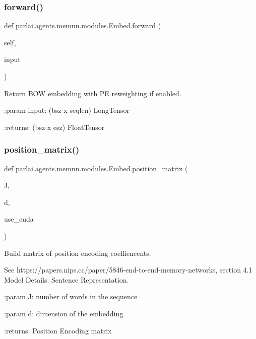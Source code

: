 \subsubsection{\texorpdfstring{forward()}{forward()}}
{\footnotesize\ttfamily def parlai.\+agents.\+memnn.\+modules.\+Embed.\+forward (\begin{DoxyParamCaption}\item[{}]{self,  }\item[{}]{input }\end{DoxyParamCaption})}

\begin{DoxyVerb}Return BOW embedding with PE reweighting if enabled.

:param input:
    (bsz x seqlen) LongTensor

:returns:
    (bsz x esz) FloatTensor
\end{DoxyVerb}
 \mbox{\label{classparlai_1_1agents_1_1memnn_1_1modules_1_1Embed_aa6a44a42ac7d06f0f0598b7291d1dc58}} 
\subsubsection{\texorpdfstring{position\+\_\+matrix()}{position\_matrix()}}
{\footnotesize\ttfamily def parlai.\+agents.\+memnn.\+modules.\+Embed.\+position\+\_\+matrix (\begin{DoxyParamCaption}\item[{}]{J,  }\item[{}]{d,  }\item[{}]{use\+\_\+cuda }\end{DoxyParamCaption})}

\begin{DoxyVerb}Build matrix of position encoding coeffiencents.

See https://papers.nips.cc/paper/5846-end-to-end-memory-networks,
section 4.1 Model Details: Sentence Representation.

:param J:
    number of words in the sequence

:param d:
    dimension of the embedding

:returns:
    Position Encoding matrix
\end{DoxyVerb}
 

